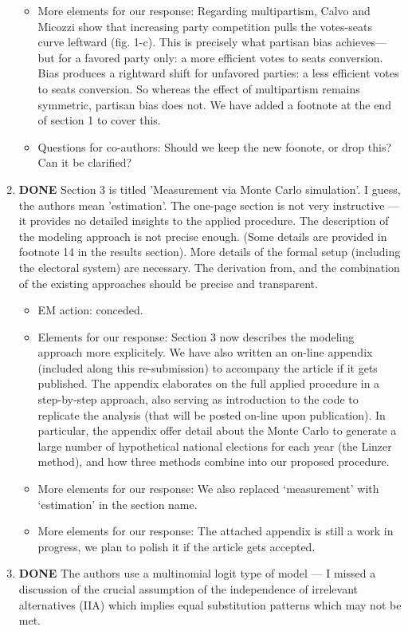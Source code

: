 \documentclass{article}
\begin{document}
\begin{enumerate}
\begin{itemize}
\item More elements for our response: Regarding multipartism, Calvo and Micozzi show that increasing party competition pulls the votes-seats curve leftward (fig. 1-c). This is precisely what partisan bias achieves---but for a favored party only: a more efficient votes to seats conversion. Bias produces a rightward shift for unfavored parties: a less efficient votes to seats conversion. So whereas the effect of multipartism remains symmetric, partisan bias does not. We have added a footnote at the end of section 1 to cover this.
\item Questions for co-authors: Should we keep the new foonote, or drop this? Can it be clarified?
\end{itemize}
\item {\bfseries\sffamily DONE} Section 3 is titled 'Measurement via Monte Carlo simulation'. I guess, the authors mean 'estimation'. The one-page section is not very instructive --- it provides no detailed insights to the applied procedure. The description of the modeling approach is not precise enough. (Some details are provided in footnote 14 in the results section).  More details of the formal setup (including the electoral system) are necessary. The derivation from, and the combination of the existing approaches should be precise and transparent.
\label{sec:orgheadline25}
\begin{itemize}
\item EM action: conceded.
\item Elements for our response: Section 3 now describes the modeling approach more explicitely. We have also written an on-line appendix (included along this re-submission) to accompany the article if it gets published. The appendix elaborates on the full applied procedure in a step-by-step approach, also serving as introduction to the code to replicate the analysis (that will be posted on-line upon publication). In particular, the appendix offer detail about the Monte Carlo to generate a large number of hypothetical national elections for each year (the Linzer method), and how three methods combine into our proposed procedure.
\item More elements for our response: We also replaced `measurement' with `estimation' in the section name.
\item More elements for our response: The attached appendix is still a work in progress, we plan to polish it if the article gets accepted.
\end{itemize}
\item {\bfseries\sffamily DONE} The authors use a multinomial logit type of model --- I missed a discussion of the crucial assumption of the independence of irrelevant alternatives (IIA) which implies equal substitution patterns which may not be met.

\end{enumerate}
\end{document}
